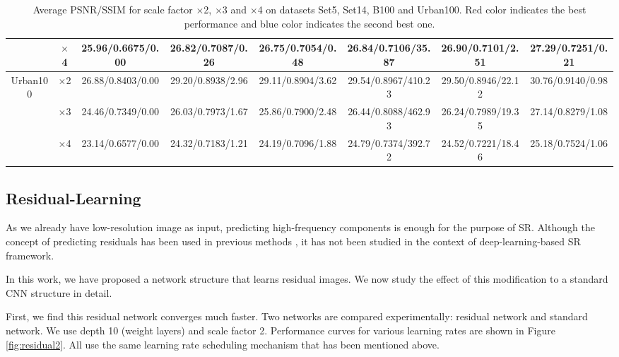 \documentclass[10pt,twocolumn,letterpaper]{article}
\begin{document}
\begin{table}
\begin{center}
\begin{tabular}{ | c | c | c | c | c | c | c | c | }
 & $\times$4 & 25.96/0.6675/0.00 & 26.82/0.7087/{\color{blue}0.26} & 26.75/0.7054/0.48 & 26.84/{\color{blue}0.7106}/35.87 & {\color{blue}26.90}/0.7101/2.51 & {\color{red}27.29}/{\color{red}0.7251}/{\color{red}0.21}\\
\hline
\hline
\multirow{3}{*}{Urban100} & $\times$2 & 26.88/0.8403/0.00 & 29.20/0.8938/{\color{blue}2.96} & 29.11/0.8904/3.62 & {\color{blue}29.54}/{\color{blue}0.8967}/410.23 & 29.50/0.8946/22.12 & {\color{red}30.76}/{\color{red}0.9140}/{\color{red}0.98}\\
 & $\times$3 & 24.46/0.7349/0.00 & 26.03/0.7973/{\color{blue}1.67} & 25.86/0.7900/2.48 & {\color{blue}26.44}/{\color{blue}0.8088}/462.93 & 26.24/0.7989/19.35 & {\color{red}27.14}/{\color{red}0.8279}/{\color{red}1.08}\\
 & $\times$4 & 23.14/0.6577/0.00 & 24.32/0.7183/{\color{blue}1.21} & 24.19/0.7096/1.88 & {\color{blue}24.79}/{\color{blue}0.7374}/392.72 & 24.52/0.7221/18.46 & {\color{red}25.18}/{\color{red}0.7524}/{\color{red}1.06}\\
\hline
\end{tabular}
\caption{Average PSNR/SSIM for scale factor $\times$2, $\times$3 and $\times$4 on datasets Set5, Set14, B100 and Urban100. {\color{red}Red color} indicates the best performance and {\color{blue}blue color} indicates the second best one.}
\label{tbl:benchmark}
\end{center}
\end{table}


\subsection{Residual-Learning}
\label{sec:residual}

As we already have low-resolution image as input, predicting high-frequency components is enough for the purpose of SR. Although the concept of predicting residuals has been used in previous methods \cite{Timofte2013, Timofte,zeyde2012single}, it has not been studied in the context of deep-learning-based SR framework.

In this work, we have proposed a network structure that learns residual images. We now study the effect of this modification to a standard CNN structure in detail. 

First, we find this residual network converges much faster. Two networks are compared experimentally: residual network and standard network. We use depth 10 (weight layers) and scale factor 2. Performance curves for various learning rates are shown in Figure \ref{fig:residual2}. All use the same learning rate scheduling mechanism that has been mentioned above. 
\end{document}
